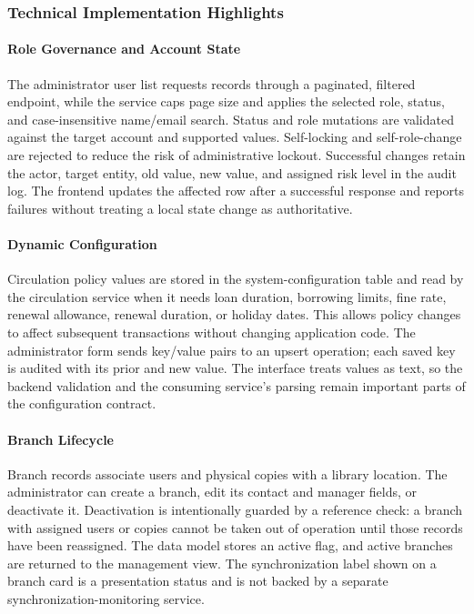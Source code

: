 \subsubsection{Technical Implementation Highlights}

\paragraph{Role Governance and Account State}
The administrator user list requests records through a paginated, filtered endpoint, while the service caps page size and applies the selected role, status, and case-insensitive name/email search. Status and role mutations are validated against the target account and supported values. Self-locking and self-role-change are rejected to reduce the risk of administrative lockout. Successful changes retain the actor, target entity, old value, new value, and assigned risk level in the audit log. The frontend updates the affected row after a successful response and reports failures without treating a local state change as authoritative.

\paragraph{Dynamic Configuration}
Circulation policy values are stored in the system-configuration table and read by the circulation service when it needs loan duration, borrowing limits, fine rate, renewal allowance, renewal duration, or holiday dates. This allows policy changes to affect subsequent transactions without changing application code. The administrator form sends key/value pairs to an upsert operation; each saved key is audited with its prior and new value. The interface treats values as text, so the backend validation and the consuming service's parsing remain important parts of the configuration contract.

\paragraph{Branch Lifecycle}
Branch records associate users and physical copies with a library location. The administrator can create a branch, edit its contact and manager fields, or deactivate it. Deactivation is intentionally guarded by a reference check: a branch with assigned users or copies cannot be taken out of operation until those records have been reassigned. The data model stores an active flag, and active branches are returned to the management view. The synchronization label shown on a branch card is a presentation status and is not backed by a separate synchronization-monitoring service.

